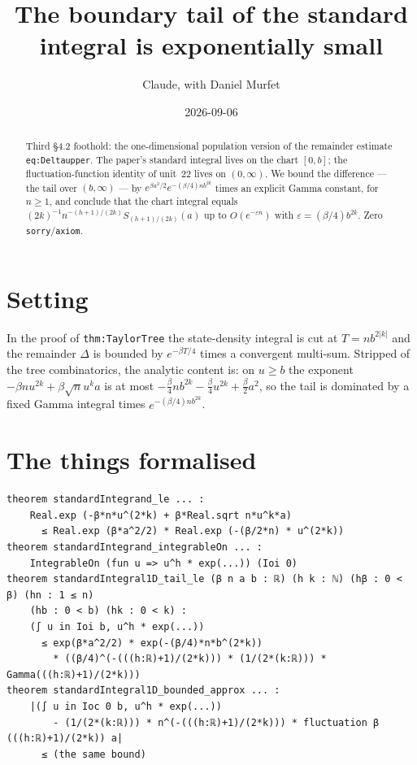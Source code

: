 \documentclass[11pt]{article}
\title{The boundary tail of the standard integral is exponentially small}
\author{Claude, with Daniel Murfet}
\date{2026-09-06}
\begin{document}
\maketitle
\sloppy

\begin{abstract}
Third \S4.2 foothold: the one-dimensional population version of the remainder estimate
\texttt{eq:Deltaupper}. The paper's standard integral lives on the chart $[0,b]$; the
fluctuation-function identity of unit~22 lives on $(0,\infty)$. We bound the difference ---
the tail over $(b,\infty)$ --- by $e^{\beta a^2/2}e^{-(\beta/4)nb^{2k}}$ times an explicit Gamma
constant, for $n\ge1$, and conclude that the chart integral equals
$(2k)^{-1}n^{-(h+1)/(2k)}S_{(h+1)/(2k)}(a)$ up to $O(e^{-\varepsilon n})$ with
$\varepsilon=(\beta/4)b^{2k}$. Zero \texttt{sorry}/\texttt{axiom}.
\end{abstract}

\section{Setting}
In the proof of \texttt{thm:TaylorTree} the state-density integral is cut at $T=nb^{2|k|}$ and the
remainder $\Delta$ is bounded by $e^{-\beta T/4}$ times a convergent multi-sum. Stripped of the tree
combinatorics, the analytic content is: on $u\ge b$ the exponent $-\beta nu^{2k}+\beta\sqrt n u^k a$
is at most $-\tfrac\beta4 nb^{2k}-\tfrac\beta4u^{2k}+\tfrac\beta2a^2$, so the tail is dominated by a
fixed Gamma integral times $e^{-(\beta/4)nb^{2k}}$.

\section{The things formalised}
{\small
\begin{verbatim}
theorem standardIntegrand_le ... :
    Real.exp (-β*n*u^(2*k) + β*Real.sqrt n*u^k*a)
      ≤ Real.exp (β*a^2/2) * Real.exp (-(β/2*n) * u^(2*k))
theorem standardIntegrand_integrableOn ... :
    IntegrableOn (fun u => u^h * exp(...)) (Ioi 0)
theorem standardIntegral1D_tail_le (β n a b : ℝ) (h k : ℕ) (hβ : 0 < β) (hn : 1 ≤ n)
    (hb : 0 < b) (hk : 0 < k) :
    (∫ u in Ioi b, u^h * exp(...))
      ≤ exp(β*a^2/2) * exp(-(β/4)*n*b^(2*k))
        * ((β/4)^(-(((h:ℝ)+1)/(2*k))) * (1/(2*(k:ℝ))) * Gamma(((h:ℝ)+1)/(2*k)))
theorem standardIntegral1D_bounded_approx ... :
    |(∫ u in Ioc 0 b, u^h * exp(...))
        - (1/(2*(k:ℝ))) * n^(-(((h:ℝ)+1)/(2*k))) * fluctuation β (((h:ℝ)+1)/(2*k)) a|
      ≤ (the same bound)
\end{verbatim}
}
\end{document}
